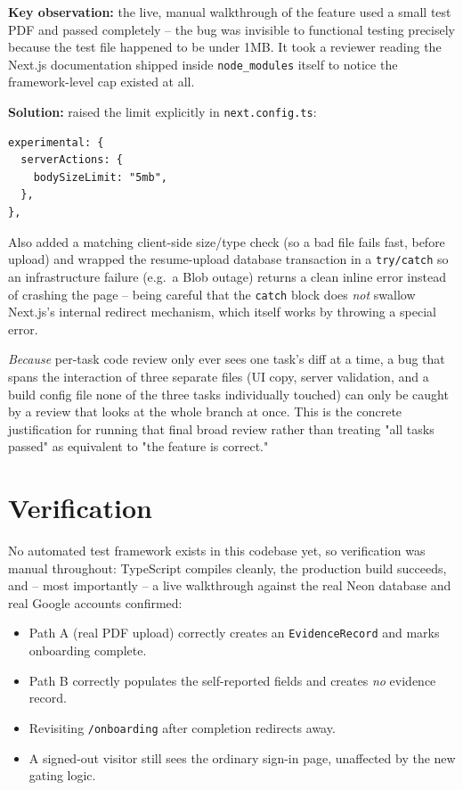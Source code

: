 \documentclass[11pt,a4paper]{article}
\begin{document}
\textbf{Key observation:} the live, manual walkthrough of the
feature used a small test PDF and passed completely -- the bug
was invisible to functional testing precisely because the test
file happened to be under 1MB. It took a reviewer reading the
Next.js documentation shipped inside \texttt{node\_modules}
itself to notice the framework-level cap existed at all.

\textbf{Solution:} raised the limit explicitly in
\texttt{next.config.ts}:
\begin{lstlisting}
experimental: {
  serverActions: {
    bodySizeLimit: "5mb",
  },
},
\end{lstlisting}
Also added a matching client-side size/type check (so a bad file
fails fast, before upload) and wrapped the resume-upload database
transaction in a \texttt{try/catch} so an infrastructure failure
(e.g.\ a Blob outage) returns a clean inline error instead of
crashing the page -- being careful that the \texttt{catch} block
does \emph{not} swallow Next.js's internal redirect mechanism,
which itself works by throwing a special error.

\emph{Because} per-task code review only ever sees one task's
diff at a time, a bug that spans the interaction of three
separate files (UI copy, server validation, and a build config
file none of the three tasks individually touched) can only be
caught by a review that looks at the whole branch at once. This
is the concrete justification for running that final broad
review rather than treating "all tasks passed" as equivalent to
"the feature is correct."

\section{Verification}
No automated test framework exists in this codebase yet, so
verification was manual throughout: TypeScript compiles cleanly,
the production build succeeds, and -- most importantly -- a live
walkthrough against the real Neon database and real Google
accounts confirmed:
\begin{itemize}[leftmargin=0.7cm]
  \item Path A (real PDF upload) correctly creates an
    \texttt{EvidenceRecord} and marks onboarding complete.
  \item Path B correctly populates the self-reported fields and
    creates \emph{no} evidence record.
  \item Revisiting \texttt{/onboarding} after completion redirects
    away.
  \item A signed-out visitor still sees the ordinary sign-in page,
    unaffected by the new gating logic.
\end{itemize}
\end{document}
